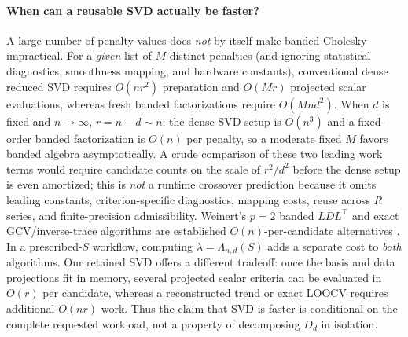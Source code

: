 \paragraph{When can a reusable SVD actually be faster?}
A large number of penalty values does \emph{not} by
itself make banded Cholesky impractical.
For a \emph{given} list of $M$ distinct penalties
(and ignoring statistical diagnostics, smoothness mapping,
and hardware constants), conventional dense reduced SVD
requires $O(nr^2)$ preparation and $O(Mr)$ projected
scalar evaluations, whereas fresh banded factorizations
require $O(Mnd^2)$.
When $d$ is fixed and $n\to\infty$, $r=n-d\sim n$:
the dense SVD setup is $O(n^3)$ and a fixed-order
banded factorization is $O(n)$ per penalty,
so a moderate fixed $M$ favors banded algebra
asymptotically. A crude comparison of these
two leading work terms would require candidate
counts on the scale of $r^2/d^2$ before the dense
setup is even amortized; this is \emph{not} a
runtime crossover prediction because it omits
leading constants, criterion-specific diagnostics,
mapping costs, reuse across $R$ series,
and finite-precision admissibility.
Weinert's $p=2$ banded $LDL^\top$ and exact
GCV/inverse-trace algorithms are established
$O(n)$-per-candidate alternatives
\citep[Secs.~1--2]{weinert2007}.
In a prescribed-$S$ workflow, computing
$\lambda=\Lambda_{n,d}(S)$ adds a separate
cost to \emph{both} algorithms. Our retained SVD
offers a different tradeoff: once the
basis and data projections fit in memory,
several projected scalar criteria can be
evaluated in $O(r)$ per candidate, whereas
a reconstructed trend or exact LOOCV requires
additional $O(nr)$ work. Thus the claim
that SVD is faster is conditional on the
complete requested workload, not a property of
decomposing $D_d$ in isolation.

